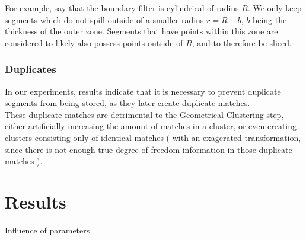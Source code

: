 For example, say that the boundary filter is cylindrical of radius $R$. We only keep segments which do not spill outside of a smaller radius $r = R-b$, $b$ being the thickness of the outer zone. Segments that have points within this zone are considered to likely also possess points outside of $R$, and to therefore be sliced.\\

\subsubsection{Duplicates}
\label{subsub:sec:duplicates}

In our experiments, results indicate that it is necessary to prevent duplicate segments from being stored, as they later create duplicate matches.\\ 

These duplicate matches are detrimental to the Geometrical Clustering step, either artificially increasing the amount of matches in a cluster, or even creating clusters consisting only of identical matches ( with an exagerated transformation, since there is not enough true degree of freedom information in those duplicate matches ).


\section{Results}
\label{sec:segmatch-results}

Influence of parameters
